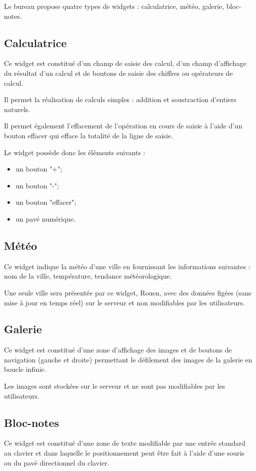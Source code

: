 Le bureau propose quatre types de widgets : calculatrice, météo, galerie, bloc-notes.

\subsection*{Calculatrice}
Ce widget est constitué d'un champ de saisie des calcul, d'un champ d'affichage du résultat d'un calcul et de boutons de saisie des chiffres ou opérateurs de calcul.

Il permet la réalisation de calculs simples : addition et soustraction d'entiers naturels.

Il permet également l'effacement de l'opération en cours de saisie à l'aide d'un bouton effacer qui efface la totalité de la ligne de saisie.

Le widget possède donc les éléments suivants :
\begin{itemize}
\item un bouton "+";
\item un bouton "-";
\item un bouton "effacer";
\item un pavé numérique.
\end{itemize}

\subsection*{Météo}
Ce widget indique la météo d'une ville en fournissant les informations suivantes : nom de la ville, température, tendance météorologique.

Une seule ville sera présentée par ce widget, Rouen, avec des données figées (sans mise à jour en temps réel) sur le serveur et non modifiables par les utilisateurs.

\subsection*{Galerie}
Ce widget est constitué d'une zone d'affichage des images et de boutons de navigation (gauche et droite) permettant le défilement des images de la galerie en boucle infinie.

Les images sont stockées sur le serveur et ne sont pas modifiables par les utilisateurs.

\subsection*{Bloc-notes}
Ce widget est constitué d'une zone de texte modifiable par une entrée standard au clavier et dans laquelle le positionnement peut être fait à l'aide d'une souris ou du pavé directionnel du clavier.